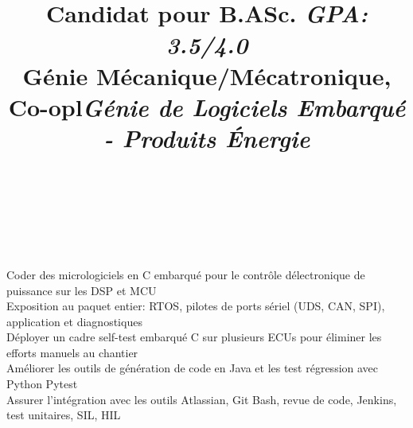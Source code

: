 \documentclass[mm]{res}
\begin{document}
\begin{resume}
\title{Candidat pour B.ASc. \textsl{GPA: 3.5/4.0}\\
G\'enie M\'ecanique/M\'ecatronique, Co-op}
\begin{position}
\end{position}


\toprule

\section{\headingexperience}
\begin{format}
\\
\title{l}\\
\body\\
\end{format}

\title{\textsl{G\'enie de Logiciels Embarqu\'e - Produits \'Energie}}
\begin{position}
\tb Coder des micrologiciels en C embarqu\'e pour le contr\^ole d\textquotesingle \'electronique de puissance sur les DSP et MCU\\
\tb Exposition au paquet entier: RTOS, pilotes de ports s\'eriel (UDS, CAN, SPI), application et diagnostiques\\
\tb D\'eployer un cadre self-test embarqu\'e C sur plusieurs ECUs pour \'eliminer les efforts manuels au chantier\\
\tb Am\'eliorer les outils de g\'en\'eration de code en Java et les test r\'egression avec Python Pytest\\
\tb Assurer l'int\'egration avec les outils Atlassian, Git Bash, revue de code, Jenkins, test unitaires, SIL, HIL
\end{position}


\end{resume}
\end{document}
